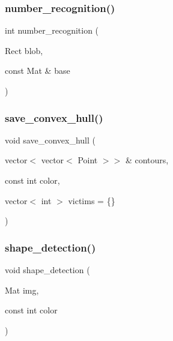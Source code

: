 \subsubsection{\texorpdfstring{number\+\_\+recognition()}{number\_recognition()}}
{\footnotesize\ttfamily int number\+\_\+recognition (\begin{DoxyParamCaption}\item[{Rect}]{blob,  }\item[{const Mat \&}]{base }\end{DoxyParamCaption})}

\mbox{\label{detection_8hh_a89d5741c34b688433a779abe0bb21fa5}} 
\subsubsection{\texorpdfstring{save\+\_\+convex\+\_\+hull()}{save\_convex\_hull()}}
{\footnotesize\ttfamily void save\+\_\+convex\+\_\+hull (\begin{DoxyParamCaption}\item[{vector$<$ vector$<$ Point $>$$>$ \&}]{contours,  }\item[{const int}]{color,  }\item[{vector$<$ int $>$}]{victims = {\ttfamily \{\}} }\end{DoxyParamCaption})}

\mbox{\label{detection_8hh_a8b32fd2b01b6598b1a04cc8b2e79d946}} 
\subsubsection{\texorpdfstring{shape\+\_\+detection()}{shape\_detection()}}
{\footnotesize\ttfamily void shape\+\_\+detection (\begin{DoxyParamCaption}\item[{Mat}]{img,  }\item[{const int}]{color }\end{DoxyParamCaption})}

